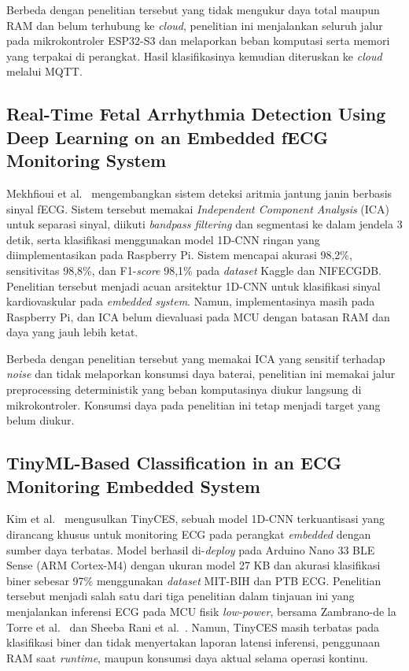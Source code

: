 Berbeda dengan penelitian tersebut yang tidak mengukur daya total maupun RAM dan belum terhubung ke \textit{cloud}, penelitian ini menjalankan seluruh jalur pada mikrokontroler ESP32-S3 dan melaporkan beban komputasi serta memori yang terpakai di perangkat. Hasil klasifikasinya kemudian diteruskan ke \textit{cloud} melalui MQTT.

\subsection{Real-Time Fetal Arrhythmia Detection Using Deep Learning on an Embedded fECG Monitoring System}

Mekhfioui et al.~\cite{mekhfioui_2025} mengembangkan sistem deteksi aritmia jantung janin berbasis sinyal fECG. Sistem tersebut memakai \textit{Independent Component Analysis} (ICA) untuk separasi sinyal, diikuti \textit{bandpass filtering} dan segmentasi ke dalam jendela 3 detik, serta klasifikasi menggunakan model 1D-CNN ringan yang diimplementasikan pada Raspberry Pi. Sistem mencapai akurasi 98,2\%, sensitivitas 98,8\%, dan F1-\textit{score} 98,1\% pada \textit{dataset} Kaggle dan NIFECGDB. Penelitian tersebut menjadi acuan arsitektur 1D-CNN untuk klasifikasi sinyal kardiovaskular pada \textit{embedded system}. Namun, implementasinya masih pada Raspberry Pi, dan ICA belum dievaluasi pada MCU dengan batasan RAM dan daya yang jauh lebih ketat.

Berbeda dengan penelitian tersebut yang memakai ICA yang sensitif terhadap \textit{noise} dan tidak melaporkan konsumsi daya baterai, penelitian ini memakai jalur preprocessing deterministik yang beban komputasinya diukur langsung di mikrokontroler. Konsumsi daya pada penelitian ini tetap menjadi target yang belum diukur.

\subsection{TinyML-Based Classification in an ECG Monitoring Embedded System}

Kim et al.~\cite{kim_2023} mengusulkan TinyCES, sebuah model 1D-CNN terkuantisasi yang dirancang khusus untuk monitoring ECG pada perangkat \textit{embedded} dengan sumber daya terbatas. Model berhasil di-\textit{deploy} pada Arduino Nano 33 BLE Sense (ARM Cortex-M4) dengan ukuran model 27 KB dan akurasi klasifikasi biner sebesar 97\% menggunakan \textit{dataset} MIT-BIH dan PTB ECG. Penelitian tersebut menjadi salah satu dari tiga penelitian dalam tinjauan ini yang menjalankan inferensi ECG pada MCU fisik \textit{low-power}, bersama Zambrano-de la Torre et al.~\cite{zambrano_2026} dan Sheeba Rani et al.~\cite{sheeba_rani_2026}. Namun, TinyCES masih terbatas pada klasifikasi biner dan tidak menyertakan laporan latensi inferensi, penggunaan RAM saat \textit{runtime}, maupun konsumsi daya aktual selama operasi kontinu.


